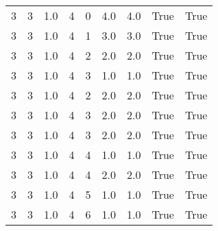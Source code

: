 \documentclass[a4paper,12pt]{article}
\begin{document}
\begin{center}
\begin{tabular}{ c c c | c c c | c | c | c}
        3 & 3 & 1.0 & 4 & 0 & 4.0 & 4.0 & True & True     \\
        3 & 3 & 1.0 & 4 & 1 & 3.0 & 3.0 & True & True     \\
        3 & 3 & 1.0 & 4 & 2 & 2.0 & 2.0 & True & True     \\
        3 & 3 & 1.0 & 4 & 3 & 1.0 & 1.0 & True & True     \\
        3 & 3 & 1.0 & 4 & 2 & 2.0 & 2.0 & True & True     \\
        3 & 3 & 1.0 & 4 & 3 & 2.0 & 2.0 & True & True     \\
        3 & 3 & 1.0 & 4 & 3 & 2.0 & 2.0 & True & True     \\
        3 & 3 & 1.0 & 4 & 4 & 1.0 & 1.0 & True & True     \\
        3 & 3 & 1.0 & 4 & 4 & 2.0 & 2.0 & True & True     \\
        3 & 3 & 1.0 & 4 & 5 & 1.0 & 1.0 & True & True     \\
        3 & 3 & 1.0 & 4 & 6 & 1.0 & 1.0 & True & True     \\
    \end{tabular}
\end{center}
\end{document}
